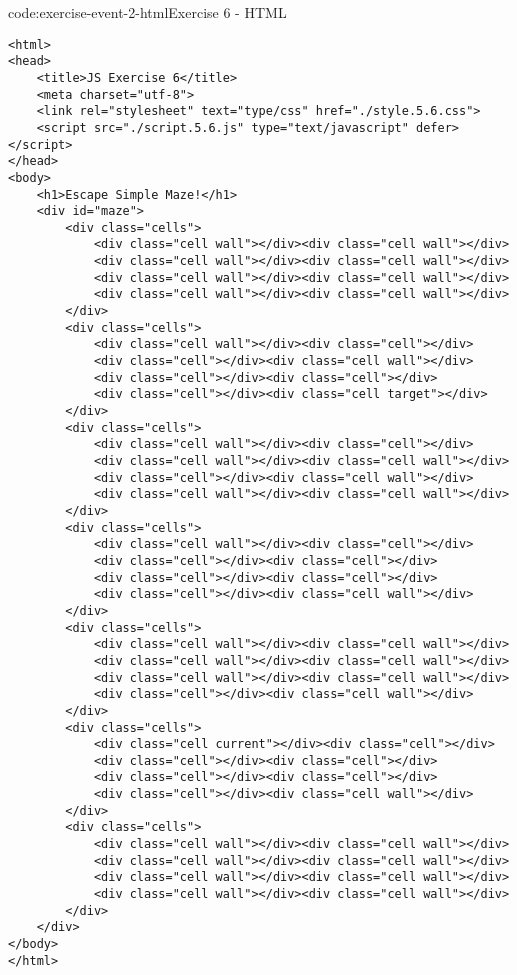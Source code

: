 \begin{codeenv}{code:exercise-event-2-html}{Exercise 6 - HTML}\begin{verbatim}
<html>
<head>
    <title>JS Exercise 6</title>
    <meta charset="utf-8">
    <link rel="stylesheet" text="type/css" href="./style.5.6.css">
    <script src="./script.5.6.js" type="text/javascript" defer></script>
</head>
<body>
    <h1>Escape Simple Maze!</h1>
    <div id="maze">
        <div class="cells">
            <div class="cell wall"></div><div class="cell wall"></div>
            <div class="cell wall"></div><div class="cell wall"></div>
            <div class="cell wall"></div><div class="cell wall"></div>
            <div class="cell wall"></div><div class="cell wall"></div>
        </div>
        <div class="cells">
            <div class="cell wall"></div><div class="cell"></div>
            <div class="cell"></div><div class="cell wall"></div>
            <div class="cell"></div><div class="cell"></div>
            <div class="cell"></div><div class="cell target"></div>
        </div>
        <div class="cells">
            <div class="cell wall"></div><div class="cell"></div>
            <div class="cell wall"></div><div class="cell wall"></div>
            <div class="cell"></div><div class="cell wall"></div>
            <div class="cell wall"></div><div class="cell wall"></div>
        </div>
        <div class="cells">
            <div class="cell wall"></div><div class="cell"></div>
            <div class="cell"></div><div class="cell"></div>
            <div class="cell"></div><div class="cell"></div>
            <div class="cell"></div><div class="cell wall"></div>
        </div>
        <div class="cells">
            <div class="cell wall"></div><div class="cell wall"></div>
            <div class="cell wall"></div><div class="cell wall"></div>
            <div class="cell wall"></div><div class="cell wall"></div>
            <div class="cell"></div><div class="cell wall"></div>
        </div>
        <div class="cells">
            <div class="cell current"></div><div class="cell"></div>
            <div class="cell"></div><div class="cell"></div>
            <div class="cell"></div><div class="cell"></div>
            <div class="cell"></div><div class="cell wall"></div>
        </div>
        <div class="cells">
            <div class="cell wall"></div><div class="cell wall"></div>
            <div class="cell wall"></div><div class="cell wall"></div>
            <div class="cell wall"></div><div class="cell wall"></div>
            <div class="cell wall"></div><div class="cell wall"></div>
        </div>
    </div>
</body>
</html>
\end{verbatim}
\end{codeenv}
